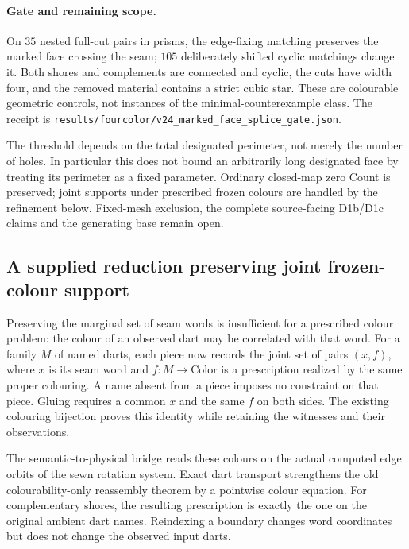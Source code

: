 \paragraph{Gate and remaining scope.}
On $35$ nested full-cut pairs in prisms, the edge-fixing matching preserves
the marked face crossing the seam; $105$ deliberately shifted cyclic
matchings change it. Both shores and complements are connected and cyclic,
the cuts have width four, and the removed material contains a strict
cubic star. These are colourable geometric controls, not instances of the
minimal-counterexample class. The receipt is
\texttt{results/fourcolor/v24\_marked\_face\_splice\_gate.json}.

The threshold depends on the total designated perimeter, not merely the
number of holes. In particular this does not bound an arbitrarily long
designated face by treating its perimeter as a fixed parameter. Ordinary
closed-map zero Count is preserved; joint supports under prescribed frozen
colours are handled by the refinement below. Fixed-mesh exclusion, the complete
source-facing D1b/D1c claims and the generating base remain open.
\subsection{A supplied reduction preserving joint frozen-colour support}
\label{sec:frozen-joint-reduction}

Preserving the marginal set of seam words is insufficient for a prescribed
colour problem: the colour of an observed dart may be correlated with that
word. For a family $M$ of named darts, each piece now records the joint set
of pairs $(x,f)$, where $x$ is its seam word and $f:M\to\mathrm{Color}$ is
a prescription realized by the same proper colouring. A name absent from
a piece imposes no constraint on that piece. Gluing requires a common $x$
and the same $f$ on both sides. The existing colouring bijection proves this
identity while retaining the witnesses and their observations.

The semantic-to-physical bridge reads these colours on the actual computed
edge orbits of the sewn rotation system. Exact dart transport strengthens
the old colourability-only reassembly theorem by a pointwise colour equation.
For complementary shores, the resulting prescription is exactly the one
on the original ambient dart names. Reindexing a boundary changes word
coordinates but does not change the observed input darts.

